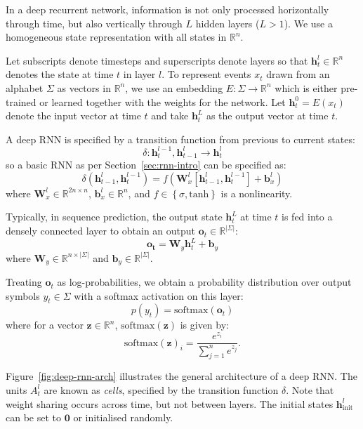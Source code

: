 \documentclass[12pt,a4paper,twoside,openright]{report}
\newcommand{\sref}[1]{Section~\ref{#1}}
\newcommand{\set}[1]{ \left\{ #1 \right\} }
\newcommand{\vect}[1]{\boldsymbol{\mathbf{#1}}}
\begin{document}
In a deep recurrent network, information is not only processed horizontally
through time, but also vertically through $L$ hidden layers ($L > 1$). We use a
homogeneous state representation with all states in $\mathbb{R}^n$.

Let subscripts denote timesteps and superscripts denote layers so that
$\vect{h}_t^l \in \mathbb{R}^n$ denotes the state at time $t$ in layer $l$. To
represent events $x_t$ drawn from an alphabet $\Sigma$ as vectors in
$\mathbb{R}^n$, we use an embedding $E : \Sigma \rightarrow \mathbb{R}^n$ which
is either pre-trained or learned together with the weights for the network. Let
$\vect{h}_t^0 = E(x_t)$ denote the input vector at time $t$ and take
$\vect{h}_t^L$ as the output vector at time $t$.

A deep RNN is specified by a transition function from previous to current
states:
$$ \delta : \vect{h}_t^{l-1}, \vect{h}_{t-1}^l \rightarrow \vect{h}_t^l $$
so a basic RNN as per \sref{sec:rnn-intro} can be specified as:
$$ \delta(\vect{h}_{t-1}^l, \vect{h}_t^{l-1}) = f(\vect{W}^l_x [\vect{h}_{t-1}^l,
\vect{h}_t^{l-1}] + \vect{b}^l_x) $$
where $\vect{W}^l_x \in \mathbb{R}^{2n \times n}$, $\vect{b}^l_x \in
\mathbb{R}^n$, and $f \in \set{ \sigma, \mathrm{tanh} }$ is a nonlinearity.

Typically, in sequence prediction, the output state $\vect{h}_t^L$ at time $t$
is fed into a densely connected layer to obtain an output $\vect{o}_t \in
\mathbb{R}^{|\Sigma|}$:
$$ \vect{o_t} = \vect{W}_y \vect{h}_t^L + \vect{b}_y $$
where $\vect{W}_y \in \mathbb{R}^{n \times |\Sigma|}$ and $\vect{b}_y \in
\mathbb{R}^{|\Sigma|}$. 

Treating $\vect{o}_t$ as log-probabilities, we obtain a probability distribution
over output symbols $y_t \in \Sigma$ with a softmax activation on this layer:
$$ p(y_t) = \mathrm{softmax}(\vect{o}_t) $$
where for a vector $\vect{z} \in \mathbb{R}^n$, $\mathrm{softmax}(\vect{z})$ is
given by:
$$ \mathrm{softmax}(\vect{z})_i = \frac{ e^{z_i} }{ \sum_{j = 1}^n e^{z_j} }. $$

Figure~\ref{fig:deep-rnn-arch} illustrates the general architecture of a deep
RNN. The units $A_t^l$ are known as \emph{cells}, specified by the transition
function $\delta$.  Note that weight sharing occurs across time, but not between
layers. The initial states $\vect{h}_{\mathrm{init}}^l$ can be set to
$\vect{0}$ or initialised randomly.
\end{document}
